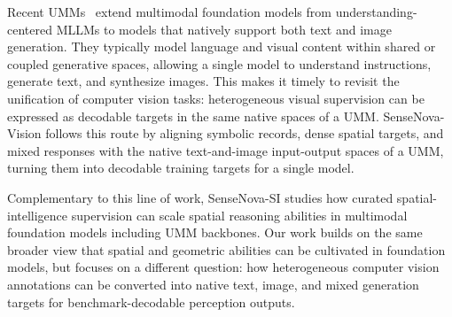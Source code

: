 Recent UMMs~\cite{chameleon,showo,janus,bagel,sensenovau1} extend multimodal foundation models from understanding-centered MLLMs to models that natively support both text and image generation.
They typically model language and visual content within shared or coupled generative spaces, allowing a single model to understand instructions, generate text, and synthesize images.
This makes it timely to revisit the unification of computer vision tasks: heterogeneous visual supervision can be expressed as decodable targets in the same native spaces of a UMM.
SenseNova-Vision follows this route by aligning symbolic records, dense spatial targets, and mixed responses with the native text-and-image input-output spaces of a UMM, turning them into decodable training targets for a single model.

Complementary to this line of work, SenseNova-SI \cite{cai2026scaling} studies how curated spatial-intelligence supervision can scale spatial reasoning abilities in multimodal foundation models including UMM backbones. Our work builds on the same broader view that spatial and geometric abilities can be cultivated in foundation models, but focuses on a different question: how heterogeneous computer vision annotations can be converted into native text, image, and mixed generation targets for benchmark-decodable perception outputs.